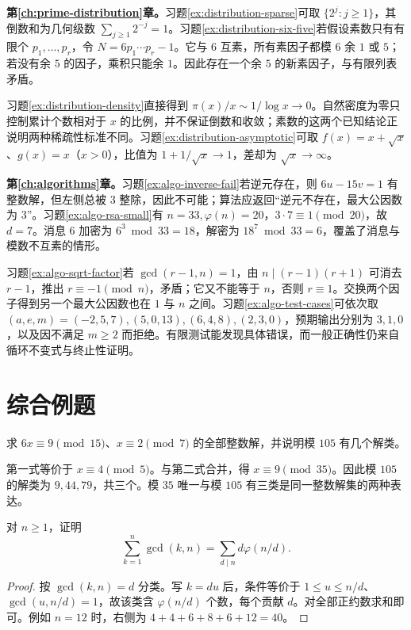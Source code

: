 \textbf{第\ref{ch:prime-distribution}章。}习题\ref{ex:distribution-sparse}可取 $\{2^j:j\ge1\}$，其倒数和为几何级数 $\sum_{j\ge1}2^{-j}=1$。习题\ref{ex:distribution-six-five}若假设素数只有有限个 $p_1,\ldots,p_r$，令 $N=6p_1\cdots p_r-1$。它与 $6$ 互素，所有素因子都模 $6$ 余 $1$ 或 $5$；若没有余 $5$ 的因子，乘积只能余 $1$。因此存在一个余 $5$ 的新素因子，与有限列表矛盾。

习题\ref{ex:distribution-density}直接得到 $\pi(x)/x\sim1/\log x\to0$。自然密度为零只控制累计个数相对于 $x$ 的比例，并不保证倒数和收敛；素数的这两个已知结论正说明两种稀疏性标准不同。习题\ref{ex:distribution-asymptotic}可取 $f(x)=x+\sqrt x$、$g(x)=x$（$x>0$），比值为 $1+1/\sqrt x\to1$，差却为 $\sqrt x\to\infty$。

\textbf{第\ref{ch:algorithms}章。}习题\ref{ex:algo-inverse-fail}若逆元存在，则 $6u-15v=1$ 有整数解，但左侧总被 $3$ 整除，因此不可能；算法应返回“逆元不存在，最大公因数为 $3$”。习题\ref{ex:algo-rsa-small}有 $n=33,\varphi(n)=20$，$3\cdot7\equiv1\pmod{20}$，故 $d=7$。消息 $6$ 加密为 $6^3\bmod33=18$，解密为 $18^7\bmod33=6$，覆盖了消息与模数不互素的情形。

习题\ref{ex:algo-sqrt-factor}若 $\gcd(r-1,n)=1$，由 $n\mid(r-1)(r+1)$ 可消去 $r-1$，推出 $r\equiv-1\pmod n$，矛盾；它又不能等于 $n$，否则 $r\equiv1$。交换两个因子得到另一个最大公因数也在 $1$ 与 $n$ 之间。习题\ref{ex:algo-test-cases}可依次取 $(a,e,m)=(-2,5,7),(5,0,13),(6,4,8),(2,3,0)$，预期输出分别为 $3,1,0$，以及因不满足 $m\ge2$ 而拒绝。有限测试能发现具体错误，而一般正确性仍来自循环不变式与终止性证明。

\section{综合例题}

\begin{example}[同余化简与解数]
求 $6x\equiv9\pmod{15}$、$x\equiv2\pmod7$ 的全部整数解，并说明模 $105$ 有几个解类。
\end{example}
\begin{solve}
第一式等价于 $x\equiv4\pmod5$。与第二式合并，得 $x\equiv9\pmod{35}$。因此模 $105$ 的解类为 $9,44,79$，共三个。模 $35$ 唯一与模 $105$ 有三类是同一整数解集的两种表达。
\end{solve}

\begin{example}[最大公因数的求和]
对 $n\ge1$，证明
\[
 \sum_{k=1}^n\gcd(k,n)=\sum_{d\mid n}d\varphi(n/d).
\]
\end{example}
\begin{proof}
按 $\gcd(k,n)=d$ 分类。写 $k=du$ 后，条件等价于 $1\le u\le n/d$、$\gcd(u,n/d)=1$，故该类含 $\varphi(n/d)$ 个数，每个贡献 $d$。对全部正约数求和即可。例如 $n=12$ 时，右侧为 $4+4+6+8+6+12=40$。
\end{proof}

